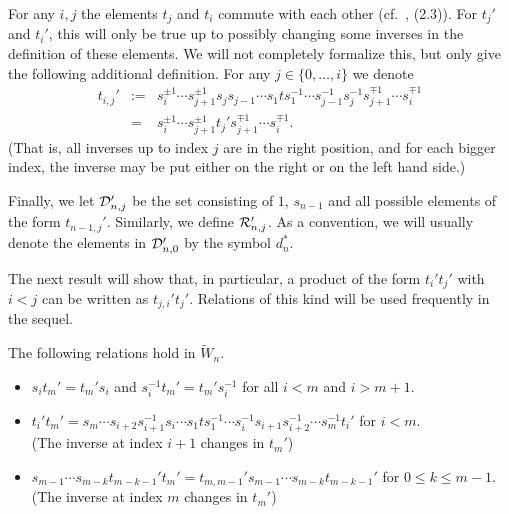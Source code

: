 For  any $i,j$ the  elements $t_j$  and $t_i$  commute with each other
(cf.\ \cite{GP}, (2.3)). For $t_j'$ and $t_i'$, this will only be true 
up to possibly changing some inverses in the definition of these elements. 
We will not completely formalize this, but only give the following 
additional definition.  For any $j \in \{0,\ldots,i\}$ we denote 
\begin{eqnarray*}
t_{i,j}' & :=  & s_i^{\pm 1} \cdots  s_{j+1}^{\pm 1} s_js_{j-1} \cdots
s_1ts_1^{-1} \cdots    s_{j-1}^{-1}s_j^{-1}s_{j+1}^{\mp      1} \cdots
s_i^{\mp 1}\\ &     =     & s_i^{\pm  1}   \cdots    s_{j+1}^{\pm   1}
t_j's_{j+1}^{\mp 1}  \cdots  s_i^{\mp  1}.\end{eqnarray*}  (That is,  all
inverses up   to index $j$  are in  the right  position,  and for each
bigger  index, the inverse may  be put either on  the  right or on the
left hand side.)

Finally,   we  let ${\cal  D}_{n,j}'$  be  the set  consisting of $1$,
$s_{n-1}$ and  all possible elements of  the form $t_{n-1,j}'$. 
Similarly, we define ${\cal R}_{n,j}'$.  As a convention, we will 
usually denote the elements in ${\cal D}_{n,0}'$ by the symbol $d_n^{*}$. 

The next result will show  that, in particular,  a product of the form
$t_i't_j'$ with $i < j$ can be written as $t_{j,i}'t_j'$. Relations of
this kind will be used frequently in the sequel.

\addtocounter{thm}{2}
\begin{lem}
The following relations hold in $\tilde{W}_n$.

\begin{itemize}

\item[(a)] $s_it_m'=t_m's_i$ and $s_i^{-1}t_m'=t_m's_i^{-1}$ for all 
$i<m$ and $i>m+1$.

\item[(b)] $t_i't_m'=s_m \cdots s_{i+2}s_{i+1}^{-1}s_i\cdots s_1ts_1^{-1}
\cdots s_i^{-1}s_{i+1}s_{i+2}^{-1}\cdots s_{m}^{-1}t_i'$ for $i < m$.\\
(The inverse at index $i+1$ changes in $t_m'$) 
\item[(c)] $s_{m-1} \cdots s_{m-k}t_{m-k-1}'t_{m}'=
t_{m,m-1}'s_{m-1} \cdots s_{m-k}t_{m-k-1}'$ for $0 \leq k \leq m-1$.
(The inverse at index $m$ changes in $t_m'$)
\end{itemize}
\end{lem}

